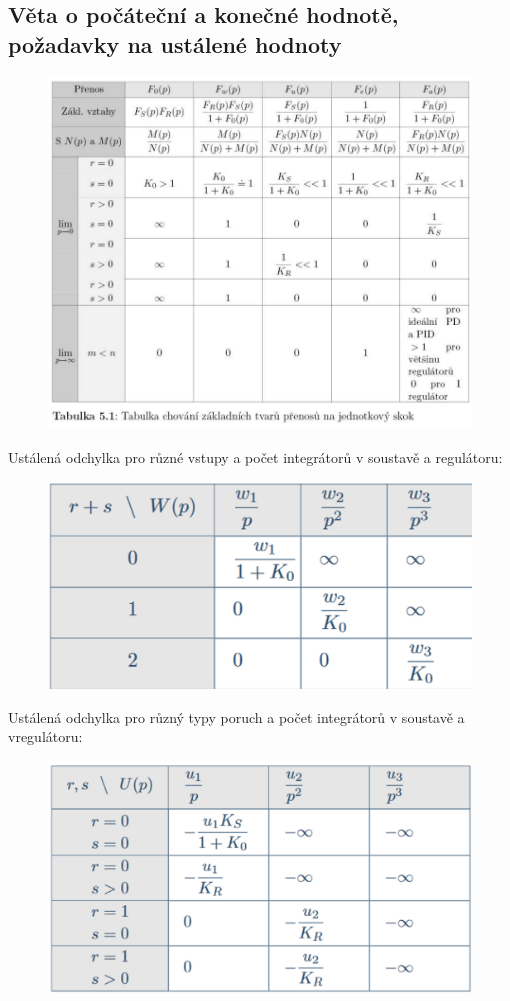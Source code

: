 \subsection*{Věta o počáteční a konečné hodnotě, požadavky na ustálené hodnoty}
\begin{figure}[H]
    \includegraphics[scale = 0.8]{images/tvary_prenosu.png}
\end{figure}
Ustálená odchylka pro různé vstupy a počet integrátorů v soustavě a regulátoru:
\begin{figure}[H]
    \includegraphics[scale = 0.3]{images/ustalena_odchylka.png}
\end{figure}
\newpage
Ustálená odchylka pro různý typy poruch a počet integrátorů v soustavě a vregulátoru:
\begin{figure}[H]
    \includegraphics[scale = 0.3]{images/ustalena_odchylka2.png}
\end{figure}
\newpage

